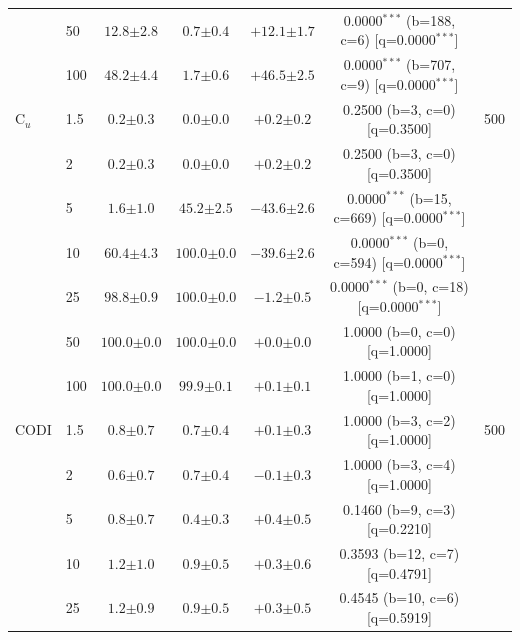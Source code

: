 \begin{table}[h!]
\begin{tabular}{l l cccc c}
 & 50 & $12.8 {\scriptstyle \pm 2.8}$ & $0.7 {\scriptstyle \pm 0.4}$ & $+12.1 {\scriptstyle \pm 1.7}$ & 0.0000$^{***}$ (b=188, c=6) [q=0.0000$^{***}$] &  \\
 & 100 & $48.2 {\scriptstyle \pm 4.4}$ & $1.7 {\scriptstyle \pm 0.6}$ & $+46.5 {\scriptstyle \pm 2.5}$ & 0.0000$^{***}$ (b=707, c=9) [q=0.0000$^{***}$] &  \\
\midrule
C$_u$ & 1.5 & $0.2 {\scriptstyle \pm 0.3}$ & $0.0 {\scriptstyle \pm 0.0}$ & $+0.2 {\scriptstyle \pm 0.2}$ & 0.2500 (b=3, c=0) [q=0.3500] & 500 \\
 & 2 & $0.2 {\scriptstyle \pm 0.3}$ & $0.0 {\scriptstyle \pm 0.0}$ & $+0.2 {\scriptstyle \pm 0.2}$ & 0.2500 (b=3, c=0) [q=0.3500] &  \\
 & 5 & $1.6 {\scriptstyle \pm 1.0}$ & $45.2 {\scriptstyle \pm 2.5}$ & $-43.6 {\scriptstyle \pm 2.6}$ & 0.0000$^{***}$ (b=15, c=669) [q=0.0000$^{***}$] &  \\
 & 10 & $60.4 {\scriptstyle \pm 4.3}$ & $100.0 {\scriptstyle \pm 0.0}$ & $-39.6 {\scriptstyle \pm 2.6}$ & 0.0000$^{***}$ (b=0, c=594) [q=0.0000$^{***}$] &  \\
 & 25 & $98.8 {\scriptstyle \pm 0.9}$ & $100.0 {\scriptstyle \pm 0.0}$ & $-1.2 {\scriptstyle \pm 0.5}$ & 0.0000$^{***}$ (b=0, c=18) [q=0.0000$^{***}$] &  \\
 & 50 & $100.0 {\scriptstyle \pm 0.0}$ & $100.0 {\scriptstyle \pm 0.0}$ & $+0.0 {\scriptstyle \pm 0.0}$ & 1.0000 (b=0, c=0) [q=1.0000] &  \\
 & 100 & $100.0 {\scriptstyle \pm 0.0}$ & $99.9 {\scriptstyle \pm 0.1}$ & $+0.1 {\scriptstyle \pm 0.1}$ & 1.0000 (b=1, c=0) [q=1.0000] &  \\
\midrule
CODI & 1.5 & $0.8 {\scriptstyle \pm 0.7}$ & $0.7 {\scriptstyle \pm 0.4}$ & $+0.1 {\scriptstyle \pm 0.3}$ & 1.0000 (b=3, c=2) [q=1.0000] & 500 \\
 & 2 & $0.6 {\scriptstyle \pm 0.7}$ & $0.7 {\scriptstyle \pm 0.4}$ & $-0.1 {\scriptstyle \pm 0.3}$ & 1.0000 (b=3, c=4) [q=1.0000] &  \\
 & 5 & $0.8 {\scriptstyle \pm 0.7}$ & $0.4 {\scriptstyle \pm 0.3}$ & $+0.4 {\scriptstyle \pm 0.5}$ & 0.1460 (b=9, c=3) [q=0.2210] &  \\
 & 10 & $1.2 {\scriptstyle \pm 1.0}$ & $0.9 {\scriptstyle \pm 0.5}$ & $+0.3 {\scriptstyle \pm 0.6}$ & 0.3593 (b=12, c=7) [q=0.4791] &  \\
 & 25 & $1.2 {\scriptstyle \pm 0.9}$ & $0.9 {\scriptstyle \pm 0.5}$ & $+0.3 {\scriptstyle \pm 0.5}$ & 0.4545 (b=10, c=6) [q=0.5919] &  \\

\end{tabular}
\end{table}

